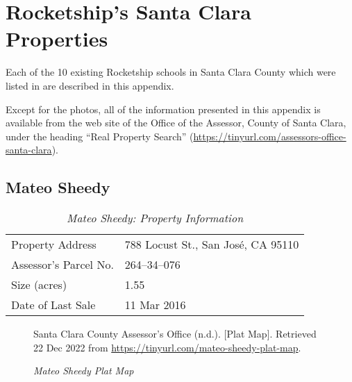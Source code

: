
\chapter{Rocketship's Santa Clara Properties}\label{appx:rocketship-property-info}\indent%

Each of the 10 existing Rocketship schools in Santa Clara County which were listed in  are described in this appendix.

Except for the photos, all of the information presented in this appendix is available from the web site of the Office of the Assessor, County of Santa Clara, under the heading ``Real Property Search'' (\url{https://tinyurl.com/assessors-office-santa-clara}).

\clearpage

\section{Mateo Sheedy}\label{sec:mateo-sheedy-info}\indent

\begin{table}[htb]
  \SingleSpacing%
  \caption[Mateo Sheedy: Property Information]{\textit{Mateo Sheedy: Property Information}}%
  \label{tab:mateo-sheedy-prop-info}
  \begin{tabular}{ll}
    \toprule
    Property Address      & 788 Locust St., San José, CA 95110 \\
    Assessor's Parcel No. &  264–34–076 \\
    Size (acres)          & 1.55 \\
    Date of Last Sale     & 11 Mar 2016 \\
    \bottomrule
  \end{tabular}
\end{table}

\begin{figure}[hbtp]
  \caption[Mateo Sheedy Plat Map]{\textit{Mateo Sheedy Plat Map}}%
  \label{fig:mateo-sheedy-plat-map}
  {Santa Clara County Assessor's Office (n.d.). [Plat Map]. Retrieved 22 Dec 2022 from  \url{https://tinyurl.com/mateo-sheedy-plat-map}.}
\end{figure}

